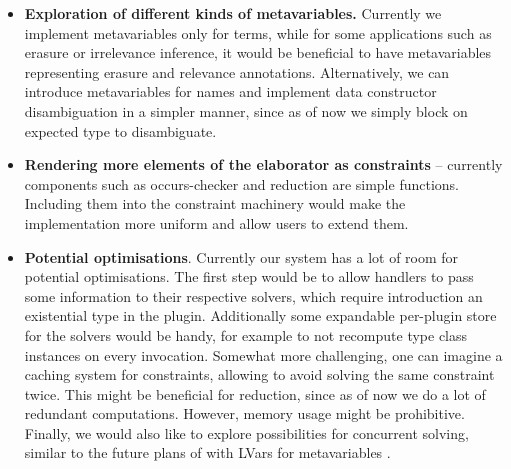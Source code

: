 \documentclass[
  sigconf,
  screen,
  review]{acmart}
\providecommand{\tightlist}{%
  \setlength{\itemsep}{0pt}\setlength{\parskip}{0pt}}
\newlength{\cslhangindent}
\newlength{\cslentryspacingunit} %
\newenvironment{CSLReferences}[2] %
 {%
  \setlength{\parindent}{0pt}
  \ifodd #1
  \let\oldpar\par
  \def\par{\hangindent=\cslhangindent\oldpar}
  \fi
  \setlength{\parskip}{#2\cslentryspacingunit}
 }%
 {}
\begin{document}
\begin{itemize}
\tightlist
\item
  \textbf{Exploration of different kinds of metavariables.} Currently we
  implement metavariables only for terms, while for some applications
  such as erasure \citep{tejiscakDependentlyTypedCalculus2020} or
  irrelevance inference, it would be beneficial to have metavariables
  representing erasure and relevance annotations. Alternatively, we can
  introduce metavariables for names and implement data constructor
  disambiguation in a simpler manner, since as of now we simply block on
  expected type to disambiguate.
\item
  \textbf{Rendering more elements of the elaborator as constraints} --
  currently components such as occurs-checker and reduction are simple
  functions. Including them into the constraint machinery would make the
  implementation more uniform and allow users to extend them.
\item
  \textbf{Potential optimisations}. Currently our system has a lot of
  room for potential optimisations. The first step would be to allow
  handlers to pass some information to their respective solvers, which
  require introduction an existential type in the plugin. Additionally
  some expandable per-plugin store for the solvers would be handy, for
  example to not recompute type class instances on every invocation.
  Somewhat more challenging, one can imagine a caching system for
  constraints, allowing to avoid solving the same constraint twice. This
  might be beneficial for reduction, since as of now we do a lot of
  redundant computations. However, memory usage might be
  prohibitive. Finally, we would also like to explore possibilities for
  concurrent solving, similar to the future plans of
  \citet{allaisTypOSOperatingSystem2022a} with LVars for metavariables
  \citep{kuperLatticebasedDataStructures2015}.
\end{itemize}

\hypertarget{refs}{}
\begin{CSLReferences}{0}{0}
\end{CSLReferences}

  
  
\end{document}
